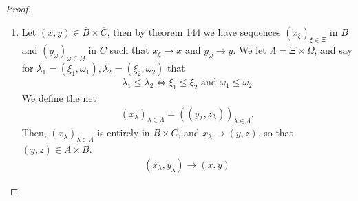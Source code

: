 \documentclass[12pt]{extarticle}
\newcommand{\<}{\langle}
\renewcommand{\>}{\rangle}
\theoremstyle{definition}
\begin{document}
\begin{proof}
  \begin{enumerate}
  \item
    Let $(x,y) \in \overline{B} \times \overline{C}$, then by theorem 144 we have sequences $(x_{\xi})_{\xi \in \Xi}$ in $B$ and $(y_{\omega})_{\omega \in \Omega}$ in $C$
    such that $x_{\xi} \to x$ and $y_{\omega} \to y$. We let $\Lambda = \Xi \times \Omega$, and say for $\lambda_1 = (\xi_1, \omega_1), \lambda_2 = (\xi_2, \omega_2)$ that
    \begin{align*}
      \lambda_1 \leq \lambda_2 \iff \xi_1 \leq \xi_2 \text{ and } \omega_1 \leq \omega_2
    \end{align*}
    We define the net
    \begin{align*}
      (x_{\lambda})_{\lambda \in \Lambda} = ((y_{\lambda}, z_{\lambda}))_{\lambda \in \Lambda}.
    \end{align*}
    Then, $(x_{\lambda})_{\lambda \in \Lambda}$ is entirely in $B \times C$, and $x_{\lambda} \to (y,z)$, so that $(y,z) \in \overline{A \times B}$.
    \begin{align*}
      (x_{\lambda}, y_{\lambda}) \to (x,y)
    \end{align*}


\end{enumerate}
\end{proof}
\end{document}
